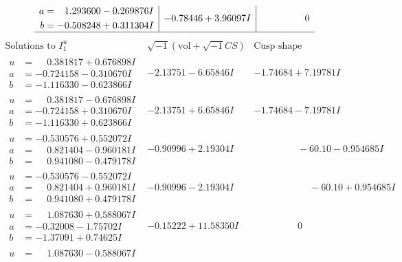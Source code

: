 \documentclass[1p]{elsarticle_modified}
\theoremstyle{definition}
\newcommand{\I}{\sqrt{-1}}
\begin{document}
$$\begin{array}{c|c|c}
\begin{aligned}
a &= \phantom{-}1.293600 - 0.269876 I \\
b &= -0.508248 + 0.311304 I\end{aligned}
 & -0.78446 + 3.96097 I & \phantom{-0.000000 } 0\\
 \hline 
 \end{array}$$\newpage$$\begin{array}{c|c|c}  
\text{Solutions to }I^u_{1}& \I (\text{vol} + \sqrt{-1}CS) & \text{Cusp shape}\\
 \hline 
\begin{aligned}
u &= \phantom{-}0.381817 + 0.676898 I \\
a &= -0.724158 - 0.310670 I \\
b &= -1.116330 - 0.623866 I\end{aligned}
 & -2.13751 - 6.65846 I & -1.74684 + 7.19781 I \\ \hline\begin{aligned}
u &= \phantom{-}0.381817 - 0.676898 I \\
a &= -0.724158 + 0.310670 I \\
b &= -1.116330 + 0.623866 I\end{aligned}
 & -2.13751 + 6.65846 I & -1.74684 - 7.19781 I \\ \hline\begin{aligned}
u &= -0.530576 + 0.552072 I \\
a &= \phantom{-}0.821404 - 0.960181 I \\
b &= \phantom{-}0.941080 - 0.479178 I\end{aligned}
 & -0.90996 + 2.19304 I & \phantom{-0.000000 }      -6
0. 10   - 0.954685 I \\ \hline\begin{aligned}
u &= -0.530576 - 0.552072 I \\
a &= \phantom{-}0.821404 + 0.960181 I \\
b &= \phantom{-}0.941080 + 0.479178 I\end{aligned}
 & -0.90996 - 2.19304 I & \phantom{-0.000000 -}     -6
0. 10   + 0.954685 I \\ \hline\begin{aligned}
u &= \phantom{-}1.087630 + 0.588067 I \\
a &= -0.32008 - 1.75702 I \\
b &= -1.37091 + 0.74625 I\end{aligned}
 & -0.15222 + 11.58350 I & \phantom{-0.000000 } 0 \\ \hline\begin{aligned}
u &= \phantom{-}1.087630 - 0.588067 I \\

\end{aligned}
\end{array}$$
\end{document}
